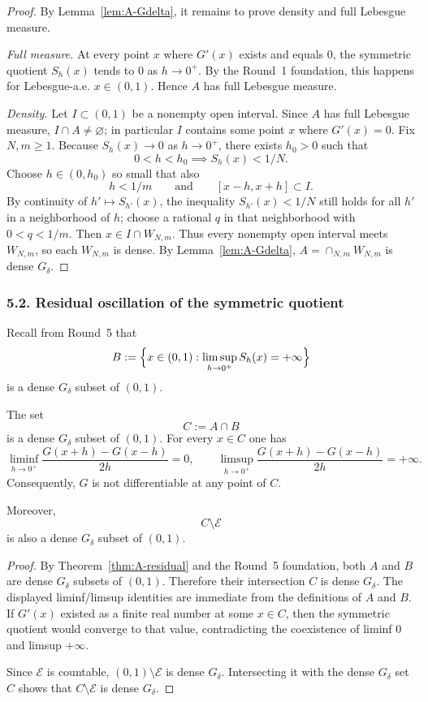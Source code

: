 \begin{proof}
By Lemma~\ref{lem:A-Gdelta}, it remains to prove density and full Lebesgue measure.

\emph{Full measure.}
At every point $x$ where $G'(x)$ exists and equals $0$, the symmetric quotient $S_h(x)$ tends to $0$ as $h\to0^+$. By the Round~1 foundation, this happens for Lebesgue-a.e. $x\in(0,1)$. Hence $A$ has full Lebesgue measure.

\emph{Density.}
Let $I\subset(0,1)$ be a nonempty open interval. Since $A$ has full Lebesgue measure, $I\cap A\neq\varnothing$; in particular $I$ contains some point $x$ where $G'(x)=0$.
Fix $N,m\ge1$. Because $S_h(x)\to0$ as $h\to0^+$, there exists $h_0>0$ such that
\[
0<h<h_0\implies S_h(x)<1/N.
\]
Choose $h\in(0,h_0)$ so small that also
\[
h<1/m
\qquad\text{and}\qquad
[x-h,x+h]\subset I.
\]
By continuity of $h'\mapsto S_{h'}(x)$, the inequality $S_{h'}(x)<1/N$ still holds for all $h'$ in a neighborhood of $h$; choose a rational $q$ in that neighborhood with $0<q<1/m$. Then $x\in I\cap W_{N,m}$.
Thus every nonempty open interval meets $W_{N,m}$, so each $W_{N,m}$ is dense.
By Lemma~\ref{lem:A-Gdelta}, $A=\cap_{N,m}W_{N,m}$ is dense $G_\delta$.
\end{proof}

\subsubsection*{5.2. Residual oscillation of the symmetric quotient}

Recall from Round~5 that
\[
B:=\Bigl\{x\in(0,1):\limsup_{h\to0^+}S_h(x)=+\infty\Bigr\}
\]
is a dense $G_\delta$ subset of $(0,1)$.

\begin{theorem}\label{thm:oscillation}
The set
\[
C:=A\cap B
\]
is a dense $G_\delta$ subset of $(0,1)$. For every $x\in C$ one has
\[
\liminf_{h\to0^+}\frac{G(x+h)-G(x-h)}{2h}=0,
\qquad
\limsup_{h\to0^+}\frac{G(x+h)-G(x-h)}{2h}=+\infty.
\]
Consequently, $G$ is not differentiable at any point of $C$.

Moreover,
\[
C\setminus\mathcal E
\]
is also a dense $G_\delta$ subset of $(0,1)$.
\end{theorem}

\begin{proof}
By Theorem~\ref{thm:A-residual} and the Round~5 foundation, both $A$ and $B$ are dense $G_\delta$ subsets of $(0,1)$. Therefore their intersection $C$ is dense $G_\delta$.
The displayed liminf/limsup identities are immediate from the definitions of $A$ and $B$.
If $G'(x)$ existed as a finite real number at some $x\in C$, then the symmetric quotient would converge to that value, contradicting the coexistence of liminf $0$ and limsup $+\infty$.

Since $\mathcal E$ is countable, $(0,1)\setminus\mathcal E$ is dense $G_\delta$. Intersecting it with the dense $G_\delta$ set $C$ shows that $C\setminus\mathcal E$ is dense $G_\delta$.
\end{proof}


